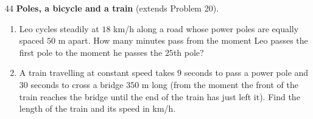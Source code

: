 \begin{probbox}{44}{}
\textbf{Poles, a bicycle and a train} (extends Problem 20).
\begin{enumerate}[label=\alph*),leftmargin=1.6em,itemsep=1pt]
\item Leo cycles steadily at $18$ km/h along a road whose power poles are equally spaced $50$ m apart. How many minutes pass from the moment Leo passes the first pole to the moment he passes the $25$th pole?
\item A train travelling at constant speed takes $9$ seconds to pass a power pole and $30$ seconds to cross a bridge $350$ m long (from the moment the front of the train reaches the bridge until the end of the train has just left it). Find the length of the train and its speed in km/h.
\end{enumerate}
\end{probbox}
